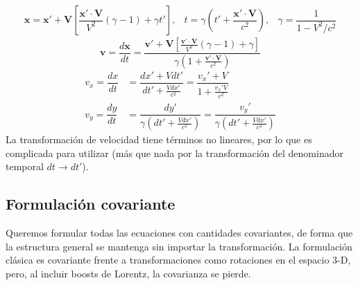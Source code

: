 \documentclass[]{article}
\numberwithin{equation}{section}
\begin{document}
\begin{equation}
	\begin{matrix}
		\mathbf{x} = \mathbf{x}' + \mathbf{V}\left[\dfrac{\mathbf{x}'\cdot\mathbf{V}}{V^2}(\gamma-1) + \gamma t'\right],& t=\gamma\left(t' + \dfrac{\mathbf{x}'\cdot\mathbf{V}}{c^2}\right), & \gamma = \dfrac{1}{1-V^2/c^2}
	\end{matrix}
\end{equation}
\begin{equation}
	\mathbf{v} = \dfrac{d\mathbf{x}}{dt} = \dfrac{\mathbf{v}' + \mathbf{V}\left[\frac{\mathbf{v}'\cdot\mathbf{V}}{V^2}(\gamma-1) + \gamma \right] }{\gamma\left(1 + \frac{\mathbf{v}'\cdot\mathbf{V}}{c^2}\right)}
\end{equation}
\begin{align}
	v_x =\dfrac{dx}{dt} &= \dfrac{dx' + Vdt'}{dt' + \frac{Vdx'}{c^2}} = \dfrac{v_x' + V}{1 + \frac{v_x' V}{c^2}}\\
	v_y =\dfrac{dy}{dt} &= \dfrac{dy'}{\gamma\left( dt' + \frac{Vdx'}{c^2}\right)} = \dfrac{v_y'}{\gamma\left( dt' + \frac{Vdx'}{c^2}\right)}
\end{align}
La transformación de velocidad tiene términos no lineares, por lo que es complicada para utilizar (más que nada por la transformación del denominador temporal \(dt\rightarrow dt'\)).

\subsection{Formulación covariante}
Queremos formular todas las ecuaciones con cantidades covariantes, de forma que la estructura general se mantenga sin importar la transformación. La formulación clásica es covariante frente a transformaciones como rotaciones en el espacio 3-D, pero, al incluir boosts de Lorentz, la covarianza se pierde.
\end{document}
